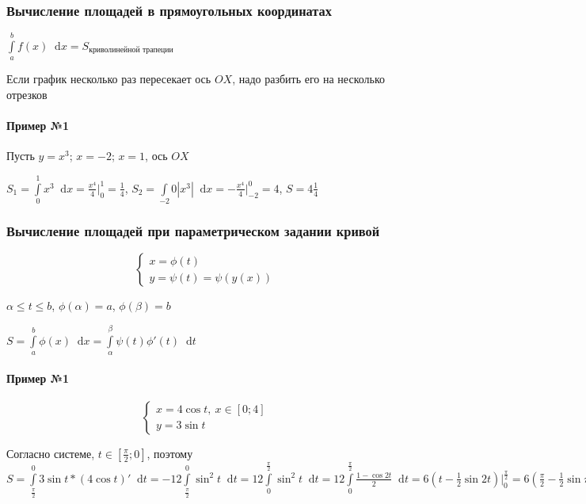 \documentclass{article}
\newcommand*\diff{\mathop{}\!\mathrm{d}}
\begin{document}
\subsubsection{Вычисление площадей в прямоугольных координатах}

$\int\limits_{a}^{b} f(x) \diff x = S_{\text{криволинейной трапеции}}$

Если график несколько раз пересекает ось $OX$, надо разбить его на несколько отрезков

\paragraph{Пример №1} Пусть $y = x^3$; $x = -2$; $x = 1$, ось $OX$

$S_1 = \int\limits_{0}^{1} x^3 \diff x = \frac{x^4}{4} \bigg|_{0}^{1} = \frac{1}{4}$, $S_2 = \int\limits_{-2}{0} |x^3| \diff x = -\frac{x^4}{4} \bigg|_{-2}^{0} = 4$, $S = 4 \frac{1}{4}$

\subsubsection{Вычисление площадей при параметрическом задании кривой}

\begin{equation}
\begin{cases}
    x = \phi(t) \\
    y = \psi(t) = \psi(y(x))
\end{cases}
\end{equation}

$\alpha \le t \le b$, $\phi(\alpha) = a$, $\phi(\beta) = b$

$S = \int\limits_{a}^{b} \phi(x) \diff x = \int\limits_{\alpha}^{\beta} \psi (t) \phi'(t) \diff t$

\paragraph{Пример №1}

\begin{equation}
\begin{cases}
    x = 4 \cos t, \ x \in [0; 4]  \\
    y = 3 \sin t
\end{cases}
\end{equation}

Согласно системе, $t \in [\frac{\pi}{2}; 0]$, поэтому $S = \int\limits_{\frac{\pi}{2}}^{0} 3 \sin t * (4 \cos t)' \diff t = -12 \int\limits_{\frac{\pi}{2}}^{0} \sin^2 t \diff t = 12 \int\limits_{0}^{\frac{\pi}{2}} \sin^2 t \diff t = 12 \int\limits_{0}^{\frac{\pi}{2}} \frac{1 - \cos 2t}{2} \diff t = 6 (t - \frac{1}{2} \sin 2 t) \bigg|_{0}^{\frac{\pi}{2}} = 6 (\frac{\pi}{2} - \frac{1}{2} \sin \pi - 0 + 0) = 3 \pi$
\end{document}
